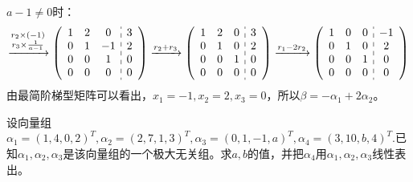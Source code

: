\documentclass[a4paper]{report}
\begin{document}
\begin{jie}
$a-1\neq 0$时：
\begin{equation*}
\xrightarrow{\substack{r_{2}\times(-1)\\r_{3}\times \frac{1}{a-1}}}
{
\left(
 \begin{array}{c:c}
\begin{matrix}
1 & 2 & 0\\
0 & 1 & -1 \\
0 & 0 & 1\\
0 & 0 & 0
\end{matrix}&
\begin{matrix}
3 \\
2  \\
0\\
0
\end{matrix}
\end{array}
\right)
}\xrightarrow{\substack{r_{2}+r_{3}}}
{
\left(
 \begin{array}{c:c}
\begin{matrix}
1 & 2 & 0\\
0 & 1 & 0 \\
0 & 0 & 1\\
0 & 0 & 0
\end{matrix}&
\begin{matrix}
3 \\
2  \\
0\\
0
\end{matrix}
\end{array}
\right)
}\xrightarrow{\substack{r_{1}-2r_{2}}}
{
\left(
 \begin{array}{c:c}
\begin{matrix}
1 & 0 & 0\\
0 & 1 & 0 \\
0 & 0 & 1\\
0 & 0 & 0
\end{matrix}&
\begin{matrix}
-1 \\
2  \\
0\\
0
\end{matrix}
\end{array}
\right)
}
\end{equation*}
由最简阶梯型矩阵可以看出，$x_1=-1,x_2=2,x_3=0$，所以$\beta=-\alpha_1+2\alpha_2$。
\end{jie}

\EX 设向量组$\alpha_1=(1,4,0,2)^T,\alpha_2=(2,7,1,3)^T,\alpha_3=(0,1,-1,a)^T,\alpha_4=(3,10,b,4)^T$.已知$\alpha_1,\alpha_2,\alpha_3$是该向量组的一个极大无关组。求$a,b$的值，并把$\alpha_4$用$\alpha_1,\alpha_2,\alpha_3$线性表出。
\end{document}

